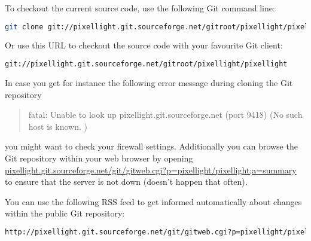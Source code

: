 To checkout the current source code, use the following Git command line:
\begin{lstlisting}[language=sh]
git clone git://pixellight.git.sourceforge.net/gitroot/pixellight/pixellight
\end{lstlisting}

Or use this \ac{URL} to checkout the source code with your favourite Git client:
\begin{lstlisting}[language=sh]
git://pixellight.git.sourceforge.net/gitroot/pixellight/pixellight
\end{lstlisting}

In case you get for instance the following error message during cloning the Git repository
\begin{quotation}
fatal: Unable to look up pixellight.git.sourceforge.net (port 9418) (No such host is known. )
\end{quotation}
you might want to check your firewall settings. Additionally you can browse the Git repository within your web browser by opening  \url{pixellight.git.sourceforge.net/git/gitweb.cgi?p=pixellight/pixellight;a=summary} to ensure that the server is not down (doesn't happen that often).

You can use the following \ac{RSS} feed to get informed automatically about changes within the public Git repository:
\begin{lstlisting}[language=sh]
http://pixellight.git.sourceforge.net/git/gitweb.cgi?p=pixellight/pixellight;a=rss
\end{lstlisting}
